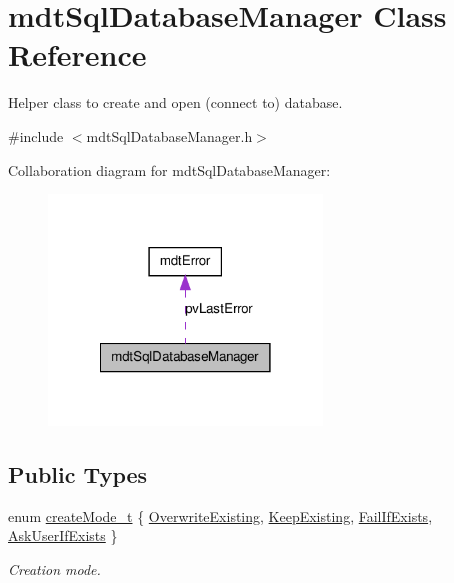 \hypertarget{classmdt_sql_database_manager}{
\section{mdtSqlDatabaseManager Class Reference}
\label{classmdt_sql_database_manager}
}


Helper class to create and open (connect to) database.  




{\ttfamily \#include $<$mdtSqlDatabaseManager.h$>$}



Collaboration diagram for mdtSqlDatabaseManager:\nopagebreak
\begin{figure}[H]
\begin{center}
\leavevmode
\includegraphics[width=206pt]{classmdt_sql_database_manager__coll__graph}
\end{center}
\end{figure}
\subsection*{Public Types}
\begin{DoxyCompactItemize}
\item 
enum \hyperlink{classmdt_sql_database_manager_a2f5b46d67a88095053a5edfc415c7418}{createMode\_\-t} \{ \hyperlink{classmdt_sql_database_manager_a2f5b46d67a88095053a5edfc415c7418a4fc53f0ca5f4c3069d1f76363dd1c33d}{OverwriteExisting}, 
\hyperlink{classmdt_sql_database_manager_a2f5b46d67a88095053a5edfc415c7418acc4863e1f1744ee33870efa25d0f4069}{KeepExisting}, 
\hyperlink{classmdt_sql_database_manager_a2f5b46d67a88095053a5edfc415c7418a8ce7ece0b37cefb97d7ebc4ca058691a}{FailIfExists}, 
\hyperlink{classmdt_sql_database_manager_a2f5b46d67a88095053a5edfc415c7418a07472a134a2612efd3b088ab8af78ad6}{AskUserIfExists}
 \}
\begin{DoxyCompactList}\small\item\em Creation mode. \end{DoxyCompactList}\end{DoxyCompactItemize}
